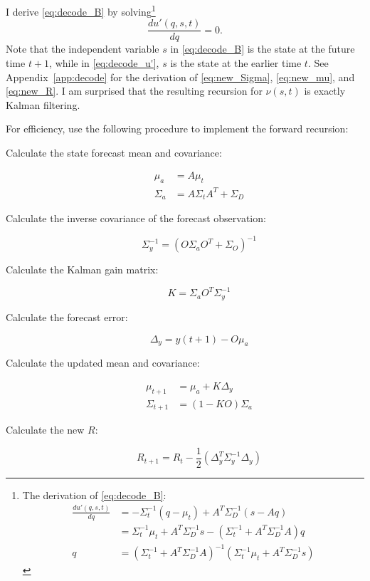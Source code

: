\documentclass[12pt]{article}
\newcommand{\ti}[2]{{#1}{(#2)}}                         %
\begin{document}
I derive \eqref{eq:decode_B} by
solving\footnote{The derivation of \eqref{eq:decode_B}:
  \begin{align*}
    \frac{d u'(q,s,t)}{d q} &= -\Sigma_t^{-1}(q-\mu_t) + A^T \Sigma_D^{-1}
    (s - Aq) \\
    &= \Sigma_t^{-1}\mu_t + A^T \Sigma_D^{-1} s -(\Sigma_t^{-1} +
    A^T\Sigma_D^{-1}A)q \\
    q &= \left( \Sigma_t^{-1} + A^T\Sigma_D^{-1}A\right)^{-1} \left(
      \Sigma_t^{-1}\mu_t + A^T \Sigma_D^{-1} s \right)
  \end{align*}
}
\begin{equation*}
  \frac{d u'(q,s,t)}{d q} = 0.
\end{equation*}
Note that the independent variable $s$ in \eqref{eq:decode_B} is the
state at the future time $t+1$, while in \eqref{eq:decode_u'}, $s$ is
the state at the earlier time $t$.  See Appendix~\ref{app:decode} for
the derivation of \eqref{eq:new_Sigma}, \eqref{eq:new_mu}, and
\eqref{eq:new_R}.  I am surprised that the resulting recursion for
$\nu(s,t)$ is exactly Kalman filtering.

For efficiency, use the following procedure to implement the forward
recursion:
\begin{description}
\item[Calculate the state forecast mean and covariance:]
  \begin{align*}
    \mu_a &= A\mu_t \\
    \Sigma_a &= A \Sigma_t A^T + \Sigma_D
  \end{align*}
\item[Calculate the inverse covariance of the forecast observation:]
  \begin{equation*}
   \Sigma_y^{-1} = \left( O\Sigma_a O^T + \Sigma_O \right)^{-1}
  \end{equation*}
\item[Calculate the Kalman gain matrix:]
  \begin{equation*}
    K = \Sigma_a O^T \Sigma_y^{-1}
  \end{equation*}
\item[Calculate the forecast error:]
  \begin{equation*}
    \Delta_y = \ti{y}{t+1} - O\mu_a
  \end{equation*}
\item[Calculate the updated mean and covariance:]
  \begin{align*}
    \mu_{t+1} &= \mu_a +  K\Delta_y \\
    \Sigma_{t+1} &= (1-KO)\Sigma_a
  \end{align*}
\item[Calculate the new $R$:]
  \begin{equation*}
    R_{t+1} = R_t - \frac{1}{2} \left(\Delta_y^T \Sigma_y^{-1}
      \Delta_y \right)
  \end{equation*}
\end{description}
\end{document}

